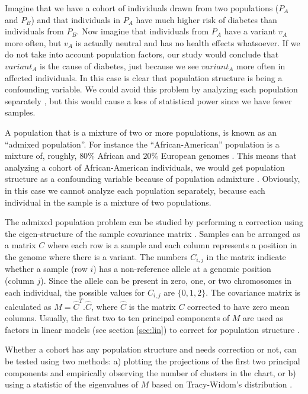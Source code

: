 Imagine that we have a cohort of individuals drawn from two populations ($P_A$ and $P_B$) and that individuals in $P_A$ have much higher risk of diabetes than individuals from $P_B$. Now imagine that individuals from $P_A$ have a variant $v_A$ more often, but $v_A$ is actually neutral and has no health effects whatsoever. If we do not take into account population factors, our study would conclude that $variant_A$ is the cause of diabetes, just because we see $variant_A$ more often in affected individuals. In this case is clear that population structure is being a confounding variable. We could avoid this problem by analyzing each population separately \cite{patterson2006population}, but this would cause a loss of statistical power since we have fewer samples.

A population that is a mixture of two or more populations, is known as an ``admixed population''. For instance the ``African-American'' population is a mixture of, roughly, $80\%$ African and $20\%$ European genomes \cite{hartl1997principles,balding2006tutorial}. This means that analyzing a cohort of African-American individuals, we would get population structure as a confounding variable because of population admixture \cite{hartl1997principles}. Obviously, in this case we cannot analyze each population separately, because each individual in the sample is a mixture of two populations.

The admixed population problem can be studied by performing a correction using the eigen-structure of the sample covariance matrix \cite{patterson2006population}. Samples can be arranged as a matrix $C$ where each row is a sample and each column represents a position in the genome where there is a variant. The numbers $C_{i,j}$ in the matrix indicate whether a sample (row $i$) has a non-reference allele at a genomic position (column $j$). Since the allele can be present in zero, one, or two chromosomes in each individual, the possible values for $C_{i,j}$ are $\{0, 1, 2\}$. The covariance matrix is calculated as $M= \hat{C}^T . \hat{C}$, where $\hat{C}$ is the matrix $C$ corrected to have zero mean columns. Usually, the first two to ten principal components of $M$ are used as factors in linear models (see section \ref{sec:lin}) to correct for population structure \cite{patterson2006population}.

Whether a cohort has any population structure and needs correction or not, can be tested using two methods: a) plotting the projections of the first two principal components and empirically observing the number of clusters in the chart, or b) using a statistic of the eigenvalues of $M$ based on Tracy-Widom's distribution \cite{patterson2006population}.

